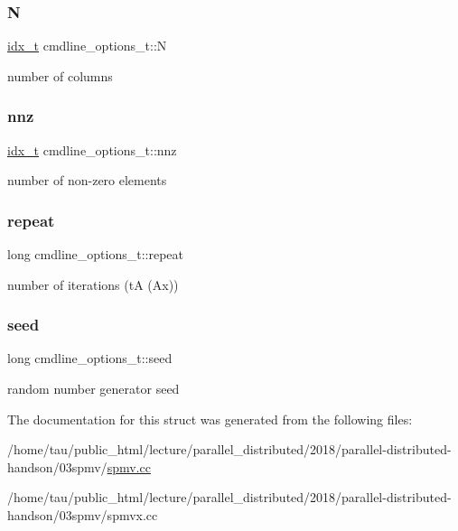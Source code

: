 \subsubsection{\texorpdfstring{N}{N}}
{\footnotesize\ttfamily \hyperlink{spmv_8cc_a8e93478a00e685bea5e6a3f617bf03a3}{idx\+\_\+t} cmdline\+\_\+options\+\_\+t\+::N}

number of columns \mbox{\label{structcmdline__options__t_aec8f7846348926cda6d62023f62d0d25}} 
\subsubsection{\texorpdfstring{nnz}{nnz}}
{\footnotesize\ttfamily \hyperlink{spmv_8cc_a8e93478a00e685bea5e6a3f617bf03a3}{idx\+\_\+t} cmdline\+\_\+options\+\_\+t\+::nnz}

number of non-\/zero elements \mbox{\label{structcmdline__options__t_acb60cada2976487316be88bf4309e7d6}} 
\subsubsection{\texorpdfstring{repeat}{repeat}}
{\footnotesize\ttfamily long cmdline\+\_\+options\+\_\+t\+::repeat}

number of iterations (tA (Ax)) \mbox{\label{structcmdline__options__t_a065412d7cdc54cdae630389c3fda266e}} 
\subsubsection{\texorpdfstring{seed}{seed}}
{\footnotesize\ttfamily long cmdline\+\_\+options\+\_\+t\+::seed}

random number generator seed 

The documentation for this struct was generated from the following files\+:\begin{DoxyCompactItemize}
\item 
/home/tau/public\+\_\+html/lecture/parallel\+\_\+distributed/2018/parallel-\/distributed-\/handson/03spmv/\hyperlink{spmv_8cc}{spmv.\+cc}\item 
/home/tau/public\+\_\+html/lecture/parallel\+\_\+distributed/2018/parallel-\/distributed-\/handson/03spmv/spmvx.\+cc\end{DoxyCompactItemize}
